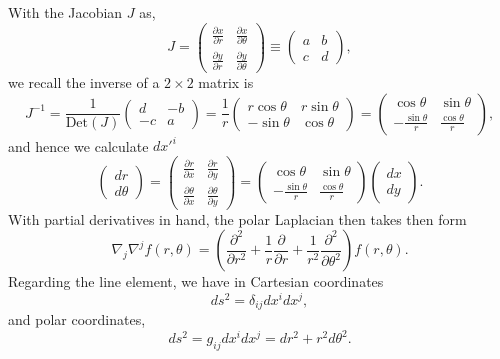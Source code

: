 \documentclass[10pt,letterpaper]{article}
\begin{document}
With the Jacobian $J$ as,
\begin{equation}
	J =
	\begin{pmatrix}
		\frac{\partial x}{\partial r}&\frac{\partial x}{\partial \theta} \\[6pt]  \frac{\partial y}{\partial r} &\frac{\partial y}{\partial \theta} 	
	\end{pmatrix}
	\equiv
	\begin{pmatrix}
		a&b\\c&d
	\end{pmatrix},
\end{equation}
we recall the inverse of a $2\times 2$ matrix is
\begin{equation}
 J^{-1} = \frac{1}{\text{Det}(J)} 
	\begin{pmatrix}
		d&-b\\-c& a
	\end{pmatrix}
	=\frac{1}{r}
	\begin{pmatrix}
	r\cos\theta & r\sin\theta \\ -\sin\theta & \cos\theta
	\end{pmatrix}
	= 
	\begin{pmatrix}
		\cos\theta & \sin\theta \\[6pt] - \frac{\sin\theta}{r} & \frac{\cos\theta}{r}
	\end{pmatrix},
\end{equation}
and hence we calculate $dx'^i$
\begin{equation}
	\begin{pmatrix}
		dr\\ d\theta
	\end{pmatrix}
	=
	\begin{pmatrix}
	\frac{\partial r}{\partial x} &\frac{\partial r}{\partial y} \\[6pt]
	\frac{\partial \theta}{\partial x} & \frac{\partial \theta}{\partial y}
	\end{pmatrix}
	=
	\begin{pmatrix}
		\cos\theta & \sin\theta \\[6pt] - \frac{\sin\theta}{r} & \frac{\cos\theta}{r}
	\end{pmatrix}
	\begin{pmatrix}
		dx\\ dy
	\end{pmatrix}.
\end{equation}
With partial derivatives in hand, the polar Laplacian then takes then form
\begin{equation}
	\nabla_j \nabla^j f(r,\theta) = \left( \frac{ \partial^2}{\partial r^2} + \frac{1}{r} \frac{\partial}{\partial r} + \frac{1}{r^2} \frac{\partial^2}{\partial \theta^2} \right)
f(r,\theta).
\end{equation}
Regarding the line element, we have in Cartesian coordinates
\begin{equation}
ds^2 = \delta_{ij} dx^i dx^j,
\end{equation}
and polar coordinates,
\begin{equation}
ds^2 = g_{ij} dx^i dx^j = dr^2 + r^2 d\theta^2.
\end{equation}
\end{document}
